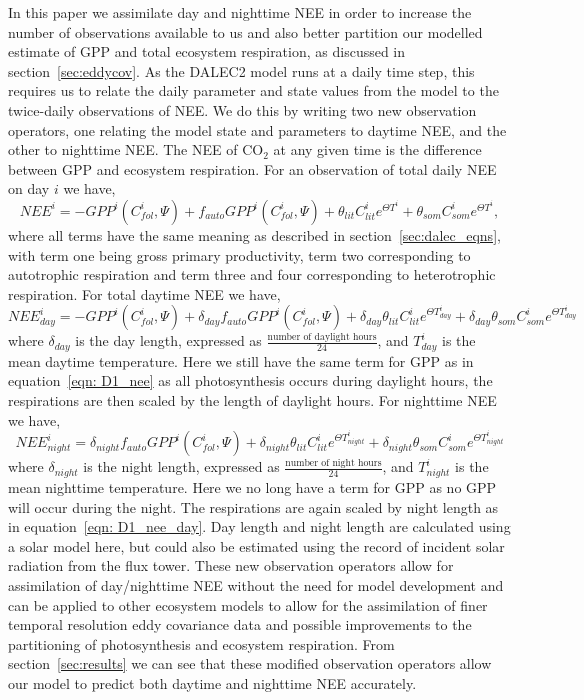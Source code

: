 \documentclass[12pt]{article}
\begin{document}
In this paper we assimilate day and nighttime NEE in order to increase the number of observations available to us and also better partition our modelled estimate of GPP and total ecosystem respiration, as discussed in section~\ref{sec:eddycov}. As the DALEC2 model runs at a daily time step, this requires us to relate the daily parameter and state values from the model to the twice-daily observations of NEE. We do this by writing two new observation operators, one relating the model state and parameters to daytime NEE, and the other to nighttime NEE. The NEE of CO\(_{2}\) at any given time is the difference between GPP and ecosystem respiration. For an observation of total daily NEE on day \(i\) we have,
\begin{equation}
NEE^{i}=-GPP^{i}(C_{fol}^{i}, \Psi) +f_{auto}GPP^{i}(C_{fol}^{i}, \Psi) + \theta_{lit}C_{lit}^i e^{\Theta T^{i}} + \theta_{som}C_{som}^i e^{\Theta T^{i}}, \label{eqn: D1_nee}
\end{equation}
where all terms have the same meaning as described in section~\ref{sec:dalec_eqns}, with term one being gross primary productivity, term two corresponding to autotrophic respiration and term three and four corresponding to heterotrophic respiration. For total daytime NEE we have,
\begin{equation}
NEE_{day}^{i} = -GPP^{i}(C_{fol}^{i}, \Psi) + \delta_{day}f_{auto}GPP^{i}(C_{fol}^{i}, \Psi) + \delta_{day}\theta_{lit}C_{lit}^i e^{\Theta T_{day}^{i}} + \delta_{day}\theta_{som}C_{som}^i e^{\Theta T_{day}^{i}} \label{eqn: D1_nee_day}
\end{equation}
where \(\delta_{day}\) is the day length, expressed as \(\frac{\text{number of daylight hours}}{24}\), and \(T_{day}^{i}\) is the mean daytime temperature. Here we still have the same term for GPP as in equation~\eqref{eqn: D1_nee} as all photosynthesis occurs during daylight hours, the respirations are then scaled by the length of daylight hours. For nighttime NEE we have,
\begin{equation}
NEE_{night}^{i} =  \delta_{night}f_{auto}GPP^{i}(C_{fol}^{i}, \Psi) + \delta_{night}\theta_{lit}C_{lit}^i e^{\Theta T_{night}^{i}} + \delta_{night}\theta_{som}C_{som}^i e^{\Theta T_{night}^{i}} \label{eqn: D1_nee_night}
\end{equation}
where \(\delta_{night}\) is the night length, expressed as \(\frac{\text{number of night hours}}{24}\), and \(T_{night}^{i}\) is the mean nighttime temperature. Here we no long have a term for GPP as no GPP will occur during the night. The respirations are again scaled by night length as in equation~\eqref{eqn: D1_nee_day}. Day length and night length are calculated using a solar model here, but could also be estimated using the record of incident solar radiation from the flux tower. These new observation operators allow for assimilation of day/nighttime NEE without the need for model development and can be applied to other ecosystem models to allow for the assimilation of finer temporal resolution eddy covariance data and possible improvements to the partitioning of photosynthesis and ecosystem respiration. From section~\ref{sec:results} we can see that these modified observation operators allow our model to predict both daytime and nighttime NEE accurately.
\end{document}
